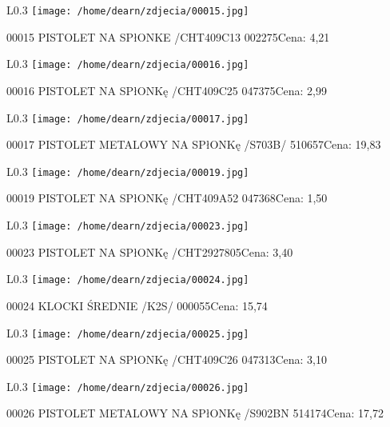 \begin{wrapfigure}{L}{0.3\textwidth}
\texttt{[image: /home/dearn/zdjecia/00015.jpg]}
\end{wrapfigure}
00015 PISTOLET NA SPłONKE /CHT409C13                  002275Cena: 4,21\newline
\begin{wrapfigure}{L}{0.3\textwidth}
\texttt{[image: /home/dearn/zdjecia/00016.jpg]}
\end{wrapfigure}
00016 PISTOLET NA SPłONKę /CHT409C25                  047375Cena: 2,99\newline
\begin{wrapfigure}{L}{0.3\textwidth}
\texttt{[image: /home/dearn/zdjecia/00017.jpg]}
\end{wrapfigure}
00017 PISTOLET METALOWY NA SPłONKę /S703B/            510657Cena: 19,83\newline
\begin{wrapfigure}{L}{0.3\textwidth}
\texttt{[image: /home/dearn/zdjecia/00019.jpg]}
\end{wrapfigure}
00019 PISTOLET NA SPłONKę /CHT409A52                  047368Cena: 1,50\newline
\begin{wrapfigure}{L}{0.3\textwidth}
\texttt{[image: /home/dearn/zdjecia/00023.jpg]}
\end{wrapfigure}
00023 PISTOLET NA SPłONKę /CHT2927805Cena: 3,40\newline
\begin{wrapfigure}{L}{0.3\textwidth}
\texttt{[image: /home/dearn/zdjecia/00024.jpg]}
\end{wrapfigure}
00024 KLOCKI ŚREDNIE /K2S/                            000055Cena: 15,74\newline
\begin{wrapfigure}{L}{0.3\textwidth}
\texttt{[image: /home/dearn/zdjecia/00025.jpg]}
\end{wrapfigure}
00025 PISTOLET NA SPłONKę /CHT409C26                  047313Cena: 3,10\newline
\begin{wrapfigure}{L}{0.3\textwidth}
\texttt{[image: /home/dearn/zdjecia/00026.jpg]}
\end{wrapfigure}
00026 PISTOLET METALOWY NA SPłONKę /S902BN            514174Cena: 17,72\newline
